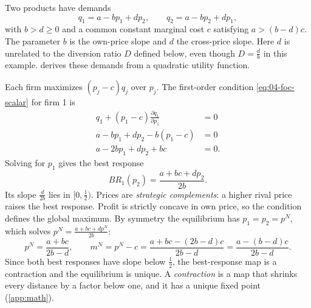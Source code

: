 \begin{example}\label{ex:04-linear-duopoly}
Two products have demands
\begin{equation*}
q_1 = a - bp_1 + dp_2, \qquad q_2 = a - bp_2 + dp_1,
\end{equation*}
with $b > d \ge 0$ and a common constant marginal cost $c$ satisfying $a > (b - d)c$. The parameter $b$ is the
own-price slope and $d$ the cross-price slope. Here $d$ is unrelated to the diversion ratio $D$ defined below,
even though $D = \frac{d}{b}$ in this example.  derives these demands from a quadratic
utility function.

Each firm maximizes $(p_j - c)q_j$ over $p_j$. The first-order condition \eqref{eq:04-foc-scalar} for firm 1 is
\begin{align*}
q_1 + (p_1 - c)\frac{\partial q_1}{\partial p_1} &= 0 \\
a - bp_1 + dp_2 - b(p_1 - c) &= 0 \\
a - 2bp_1 + dp_2 + bc &= 0.
\end{align*}
Solving for $p_1$ gives the best response
\begin{equation*}
BR_1(p_2) = \frac{a + bc + dp_2}{2b}.
\end{equation*}
Its slope $\frac{d}{2b}$ lies in $[0, \frac{1}{2})$. Prices are \emph{strategic complements}: a higher rival price
raises the best response. Profit is strictly concave in own price, so the condition defines the global maximum. By
symmetry the equilibrium has $p_1 = p_2 = p^N$, which solves $p^N = \frac{a + bc + dp^N}{2b}$:
\begin{equation*}
p^N = \frac{a + bc}{2b - d},
\qquad
m^N = p^N - c = \frac{a + bc - (2b - d)c}{2b - d} = \frac{a - (b - d)c}{2b - d}.
\end{equation*}
Since both best responses have slope below $\frac{1}{2}$, the best-response map is a contraction and the
equilibrium is unique. A \emph{contraction} is a map that shrinks every distance by a factor below one, and it has
a unique fixed point (\cref{app:math}).


\end{example}
